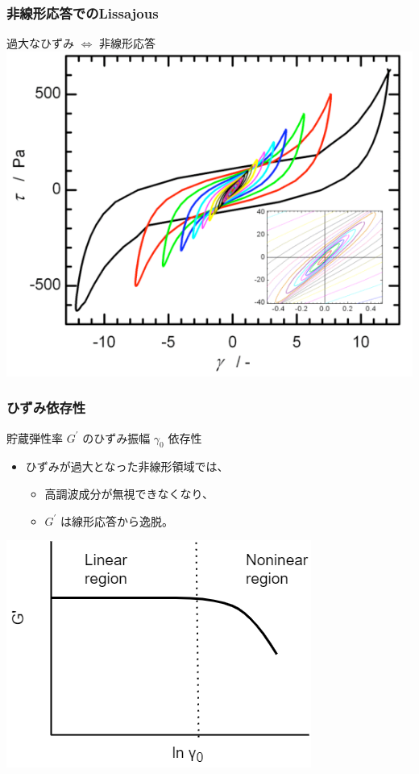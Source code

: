 \documentclass[12pt, dvipdfmx]{beamer}
\begin{document}
\begin{frame}
	\frametitle{非線形応答でのLissajous}
		\begin{alertblock}{過大なひずみ $\Leftrightarrow$ 非線形応答}
			\centering
			\includegraphics[width=.7\textwidth]{nonlinear_liss.png}	
		\end{alertblock}
\end{frame}

\begin{frame}
	\frametitle{ひずみ依存性}
		\begin{block}{貯蔵弾性率 $G^{\prime}$ のひずみ振幅 $\gamma_0$ 依存性}
			\begin{itemize}
				\item ひずみが過大となった非線形領域では、
				\begin{itemize}
					\item 高調波成分が無視できなくなり、 
					\item $G^{\prime}$ は線形応答から逸脱。
				\end{itemize}
			\end{itemize}
			\vspace{2mm}
			\centering
				\includegraphics[width=.55\textwidth]{non-linear.png}
		\end{block}
\end{frame}
\end{document}
